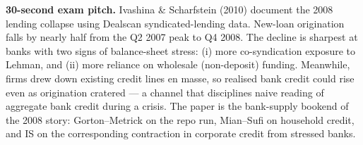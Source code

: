 \documentclass[11pt]{article}
\begin{document}
\begin{keybox}
\textbf{30-second exam pitch.} Ivashina \& Scharfstein (2010) document the 2008 lending collapse using Dealscan syndicated-lending data. New-loan origination falls by nearly half from the Q2 2007 peak to Q4 2008. The decline is sharpest at banks with two signs of balance-sheet stress: (i) more co-syndication exposure to Lehman, and (ii) more reliance on wholesale (non-deposit) funding. Meanwhile, firms drew down existing credit lines en masse, so realised bank credit could rise even as origination cratered --- a channel that disciplines naive reading of aggregate bank credit during a crisis. The paper is the bank-supply bookend of the 2008 story: Gorton--Metrick on the repo run, Mian--Sufi on household credit, and IS on the corresponding contraction in corporate credit from stressed banks.
\end{keybox}
\end{document}
